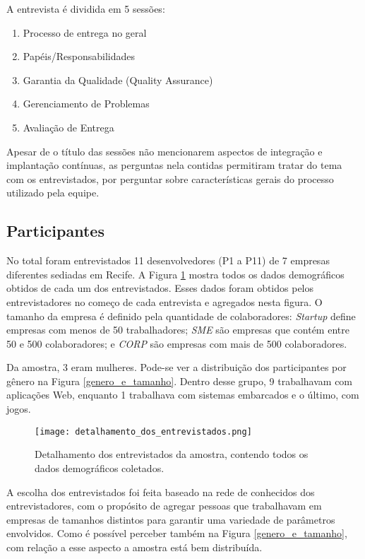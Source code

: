 A entrevista é dividida em 5 sessões: 

\begin{enumerate}
\item Processo de entrega no geral
\item Papéis/Responsabilidades
\item Garantia da Qualidade (Quality Assurance)
\item Gerenciamento de Problemas
\item Avaliação de Entrega
\end{enumerate}

Apesar de o título das sessões não mencionarem aspectos de integração e implantação contínuas, as perguntas nela contidas permitiram tratar do tema com os entrevistados, por perguntar sobre características gerais do processo utilizado pela equipe.

\subsection{Participantes}

No total foram entrevistados 11 desenvolvedores (P1 a P11) de 7 empresas diferentes sediadas em Recife. A Figura \ref{detalhamento_dos_entrevistados} mostra todos os dados demográficos obtidos de cada um dos entrevistados. Esses dados foram obtidos pelos entrevistadores no começo de cada entrevista e agregados nesta figura. O tamanho da empresa é definido pela quantidade de colaboradores: \emph{Startup} define empresas com menos de 50 trabalhadores; \emph{SME} são empresas que contém entre 50 e 500 colaboradores; e \emph{CORP} são empresas com mais de 500 colaboradores.


Da amostra, 3 eram mulheres. Pode-se ver a distribuição dos participantes por gênero na Figura \ref{genero_e_tamanho}. Dentro desse grupo, 9 trabalhavam com aplicações Web, enquanto 1 trabalhava com sistemas embarcados e o último, com jogos.

\begin{figure}[h]
\centering
\texttt{[image: detalhamento\_dos\_entrevistados.png]}
\caption{Detalhamento dos entrevistados da amostra, contendo todos os dados demográficos coletados.}
\label{detalhamento_dos_entrevistados}
\end{figure}


A escolha dos entrevistados foi feita baseado na rede de conhecidos dos entrevistadores, com o propósito de agregar pessoas que trabalhavam em empresas de tamanhos distintos para garantir uma variedade de parâmetros envolvidos. Como é possível perceber também na Figura \ref{genero_e_tamanho}, com relação a esse aspecto a amostra está bem distribuída. 

